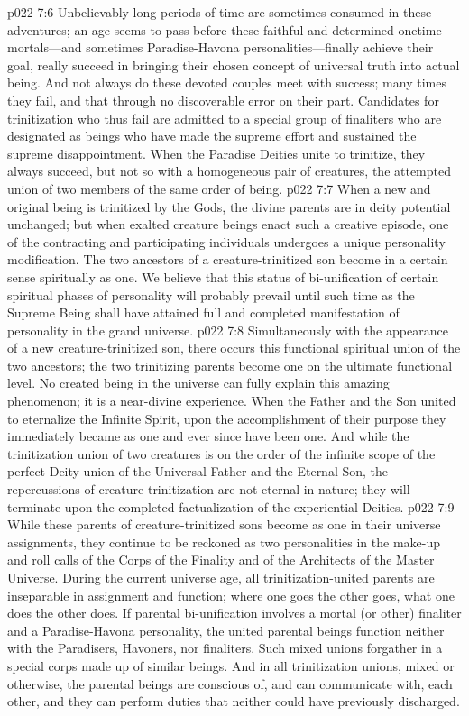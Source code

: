 \vs p022 7:6 Unbelievably long periods of time are sometimes consumed in these adventures; an age seems to pass before these faithful and determined onetime mortals---and sometimes Paradise\hyp{}Havona personalities---finally achieve their goal, really succeed in bringing their chosen concept of universal truth into actual being. And not always do these devoted couples meet with success; many times they fail, and that through no discoverable error on their part. Candidates for trinitization who thus fail are admitted to a special group of finaliters who are designated as beings who have made the supreme effort and sustained the supreme disappointment. When the Paradise Deities unite to trinitize, they always succeed, but not so with a homogeneous pair of creatures, the attempted union of two members of the same order of being.
\pc \vs p022 7:7 When a new and original being is trinitized by the Gods, the divine parents are in deity potential unchanged; but when exalted creature beings enact such a creative episode, one of the contracting and participating individuals undergoes a unique personality modification. The two ancestors of a creature\hyp{}trinitized son become in a certain sense spiritually as one. We believe that this status of bi\hyp{}unification of certain spiritual phases of personality will probably prevail until such time as the Supreme Being shall have attained full and completed manifestation of personality in the grand universe.
\vs p022 7:8 Simultaneously with the appearance of a new creature\hyp{}trinitized son, there occurs this functional spiritual union of the two ancestors; the two trinitizing parents become one on the ultimate functional level. No created being in the universe can fully explain this amazing phenomenon; it is a near\hyp{}divine experience. When the Father and the Son united to eternalize the Infinite Spirit, upon the accomplishment of their purpose they immediately became as one and ever since have been one. And while the trinitization union of two creatures is on the order of the infinite scope of the perfect Deity union of the Universal Father and the Eternal Son, the repercussions of creature trinitization are not eternal in nature; they will terminate upon the completed factualization of the experiential Deities.
\vs p022 7:9 While these parents of creature\hyp{}trinitized sons become as one in their universe assignments, they continue to be reckoned as two personalities in the make\hyp{}up and roll calls of the Corps of the Finality and of the Architects of the Master Universe. During the current universe age, all trinitization\hyp{}united parents are inseparable in assignment and function; where one goes the other goes, what one does the other does. If parental bi\hyp{}unification involves a mortal (or other) finaliter and a Paradise\hyp{}Havona personality, the united parental beings function neither with the Paradisers, Havoners, nor finaliters. Such mixed unions forgather in a special corps made up of similar beings. And in all trinitization unions, mixed or otherwise, the parental beings are conscious of, and can communicate with, each other, and they can perform duties that neither could have previously discharged.
